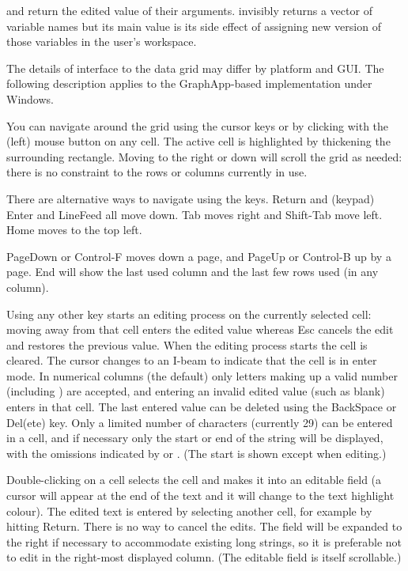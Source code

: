 %
\begin{Value}
 and  return the edited value of their
arguments.  invisibly returns a vector of variable
names but its main value is its side effect of assigning new version
of those variables in the user's workspace.
\end{Value}
%
\begin{Note}\relax
The details of interface to the data grid may differ by platform and
GUI.  The following description applies to
the GraphApp-based implementation under Windows.

You can navigate around the grid using the cursor keys or by clicking
with the (left) mouse button on any cell.  The active cell is
highlighted by thickening the surrounding rectangle.  Moving to the
right or down will scroll the grid as needed: there is no constraint
to the rows or columns currently in use.

There are alternative ways to navigate using the keys.  Return and
(keypad) Enter and LineFeed all move down. Tab moves right and
Shift-Tab move left.  Home moves to the top left.

PageDown or Control-F moves down a page, and PageUp or
Control-B up by a page.  End will show the last used column and the
last few rows used (in any column).

Using any other key starts an editing process on the currently
selected cell: moving away from that cell enters the edited value
whereas Esc cancels the edit and restores the previous value.  When
the editing process starts the cell is cleared.
The cursor changes to an I-beam to indicate that the cell is in enter mode.
In numerical columns
(the default) only letters making up a valid number (including
) are accepted, and entering an invalid edited value (such
as blank) enters  in that cell.  The last entered value can
be deleted using the  BackSpace or Del(ete) key.  Only a limited
number of characters (currently 29) can be entered in a cell, and if
necessary only the start or end of the string will be displayed, with the
omissions indicated by \code{>} or \code{<}.  (The start is shown
except when editing.)

Double-clicking on a cell selects the cell and makes it into an
editable field (a cursor will appear at the end of the text and it
will change to the text highlight colour).  The edited text is
entered by selecting another cell, for example by hitting Return.
There is no way to cancel the edits.  The field will be expanded to
the right if necessary to accommodate existing long strings, so it is
preferable not to edit in the right-most displayed column.  (The
editable field is itself scrollable.)


\end{Note}

